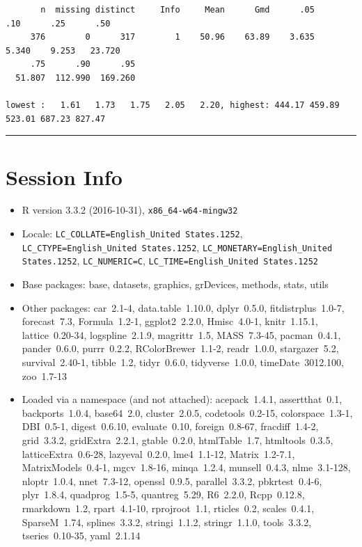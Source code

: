 \documentclass[]{elsarticle} %
\begin{document}
\begin{spacing}{0.7}
{{\smaller
\begin{verbatim}
       n  missing distinct     Info     Mean      Gmd      .05      .10      .25      .50 
     376        0      317        1    50.96    63.89    3.635    5.340    9.253   23.720 
     .75      .90      .95 
  51.807  112.990  169.260 

lowest :   1.61   1.73   1.75   2.05   2.20, highest: 444.17 459.89 523.01 687.23 827.47
\end{verbatim}
}
\smallskip\hrule\smallskip
}\end{spacing}

\section{Session Info}\label{session-info}

\begin{itemize}\raggedright
  \item R version 3.3.2 (2016-10-31), \verb|x86_64-w64-mingw32|
  \item Locale: \verb|LC_COLLATE=English_United States.1252|, \verb|LC_CTYPE=English_United States.1252|, \verb|LC_MONETARY=English_United States.1252|, \verb|LC_NUMERIC=C|, \verb|LC_TIME=English_United States.1252|
  \item Base packages: base, datasets, graphics, grDevices,
    methods, stats, utils
  \item Other packages: car~2.1-4, data.table~1.10.0, dplyr~0.5.0,
    fitdistrplus~1.0-7, forecast~7.3, Formula~1.2-1,
    ggplot2~2.2.0, Hmisc~4.0-1, knitr~1.15.1, lattice~0.20-34,
    logspline~2.1.9, magrittr~1.5, MASS~7.3-45, pacman~0.4.1,
    pander~0.6.0, purrr~0.2.2, RColorBrewer~1.1-2, readr~1.0.0,
    stargazer~5.2, survival~2.40-1, tibble~1.2, tidyr~0.6.0,
    tidyverse~1.0.0, timeDate~3012.100, zoo~1.7-13
  \item Loaded via a namespace (and not attached): acepack~1.4.1,
    assertthat~0.1, backports~1.0.4, base64~2.0, cluster~2.0.5,
    codetools~0.2-15, colorspace~1.3-1, DBI~0.5-1, digest~0.6.10,
    evaluate~0.10, foreign~0.8-67, fracdiff~1.4-2, grid~3.3.2,
    gridExtra~2.2.1, gtable~0.2.0, htmlTable~1.7, htmltools~0.3.5,
    latticeExtra~0.6-28, lazyeval~0.2.0, lme4~1.1-12,
    Matrix~1.2-7.1, MatrixModels~0.4-1, mgcv~1.8-16, minqa~1.2.4,
    munsell~0.4.3, nlme~3.1-128, nloptr~1.0.4, nnet~7.3-12,
    openssl~0.9.5, parallel~3.3.2, pbkrtest~0.4-6, plyr~1.8.4,
    quadprog~1.5-5, quantreg~5.29, R6~2.2.0, Rcpp~0.12.8,
    rmarkdown~1.2, rpart~4.1-10, rprojroot~1.1, rticles~0.2,
    scales~0.4.1, SparseM~1.74, splines~3.3.2, stringi~1.1.2,
    stringr~1.1.0, tools~3.3.2, tseries~0.10-35, yaml~2.1.14
\end{itemize}
\end{document}
